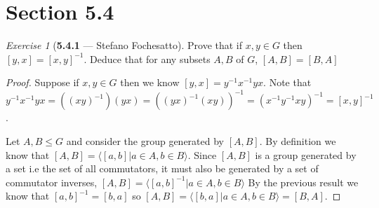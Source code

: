 \documentclass[12pt]{amsart}
\theoremstyle{remark}
\newtheorem*{exercise}{Exercise}%
\theoremstyle{mycomment}
\begin{document}
\section*{Section 5.4}
\begin{exercise}[\textbf{5.4.1} --- Stefano Fochesatto] Prove that if $x, y \in G$ then $[y, x]= [x, y]^{-1}$. Deduce that for any subsets $A, B$ of $G$, $[A, B] = [B, A]$
  \begin{proof} Suppose if $x, y \in G$ then we know $[y, x] = y^{-1}x^{-1}yx$. Note that $y^{-1}x^{-1}yx = ((xy)^{-1})(yx) = ((yx)^{-1}(xy))^{-1} = (x^{-1}y^{-1}xy)^{-1} = [x, y]^{-1}$.

    Let $A, B \leq G$ and consider the group generated by $[A, B]$. By definition we know that
    $[A, B] = \langle [a, b] | a \in A, b \in B \rangle$. Since $[A, B]$ is a group generated by a set i.e the set of all commutators, it must also be generated by a set of commutator inverses, $[A, B] = \langle [a, b]^{-1} | a \in A, b \in B \rangle$
    By the previous result we know that $[a, b]^{-1} = [b, a]$ so $[A, B] = \langle [b, a] | a \in A, b \in B \rangle = [B, A]$. 
  \end{proof}
\end{exercise}
\vspace{.15in}
\end{document}
